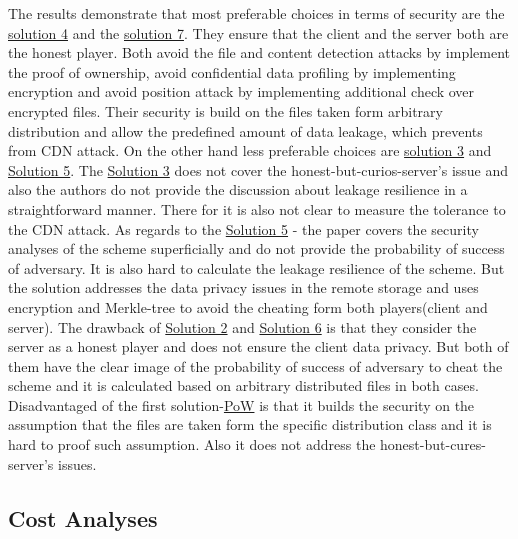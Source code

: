 \documentclass[12pt]{article}
\begin{document}
The results demonstrate that most preferable choices in terms of security are the \hyperref[sub:Soltuion4]{solution 4} and the \hyperref[sub:Soltuion7]{solution 7}. They ensure that the client and the server both are the honest player. Both avoid the file and content detection attacks by implement the proof of ownership, avoid confidential data profiling by implementing  encryption and avoid position attack by implementing additional check over encrypted files. Their security is build on the files taken form arbitrary distribution and allow the predefined amount of data leakage, which prevents from CDN attack. On the other hand less preferable choices are  \hyperref[sub:Soltuion3]{solution 3} and \hyperref[sub:Soltuion5]{Solution 5}. The \hyperref[sub:Soltuion3]{Solution 3}  does not cover the honest-but-curios-server's issue and also the authors do not provide the discussion about leakage resilience in a straightforward manner. There for it is also not clear to measure the tolerance to the CDN attack. As regards to the \hyperref[sub:Soltuion5]{Solution 5} - the paper covers the security analyses of the scheme  superficially and do not provide the probability of success of adversary. It is also hard to calculate the leakage resilience of the scheme. But the solution  addresses the  data privacy issues in the remote storage and uses encryption and Merkle-tree to avoid the cheating form both players(client and server). The drawback of \hyperref[sub:Soltuion2]{Solution 2} and \hyperref[sub:Soltuion6]{Solution 6} is that they consider the server as a honest player and does not ensure the client data privacy. But both of them have the clear image of the probability of success of adversary to cheat the scheme and it is calculated based on arbitrary distributed files in both cases. Disadvantaged of the first solution-\hyperref[sub:Soltuion1] {PoW} is that it builds the security on the assumption that the files are taken form the specific distribution class and it is hard to proof such assumption. Also it does not address the honest-but-cures-server's issues.


\subsection{Cost Analyses}
\label{sub:Cost}
\end{document}

